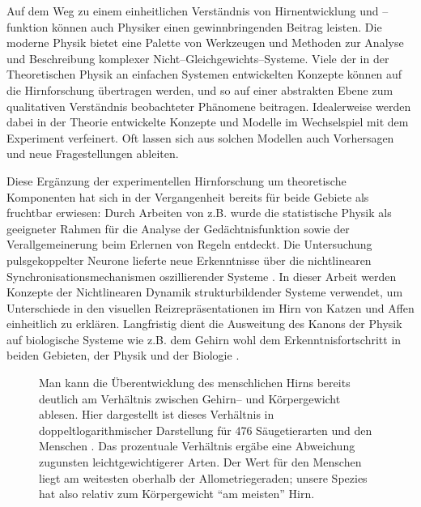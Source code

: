 Auf dem Weg zu einem einheitlichen Verständnis von Hirnentwicklung und
\mbox{--funktion} können auch Physiker einen gewinnbringenden Beitrag leisten.
Die moderne Physik bietet eine Palette von Werkzeugen und Methoden zur
Analyse und Beschreibung komplexer Nicht--Gleichgewichts--Systeme.  Viele
der in der Theoretischen Physik an einfachen Systemen entwickelten Konzepte
können auf die Hirnforschung übertragen werden, und so auf einer
abstrakten Ebene zum qualitativen Verständnis beobachteter Phänomene
beitragen. Idealerweise werden dabei in der Theorie entwickelte Konzepte
und Modelle im Wechselspiel mit dem Experiment verfeinert. Oft lassen sich
aus solchen Modellen auch Vorhersagen und neue Fragestellungen ableiten.

Diese Ergänzung der experimentellen Hirnforschung um theoretische
Komponenten hat sich in der Vergangenheit bereits für beide Gebiete als
fruchtbar erwiesen: Durch Arbeiten von 
z.B. wurde die statistische Physik als geeigneter Rahmen für die Analyse
der Gedächtnisfunktion sowie der Verallgemeinerung beim Erlernen von
Regeln entdeckt.  Die Untersuchung pulsgekoppelter Neurone lieferte neue
Erkenntnisse über die nichtlinearen Synchronisationsmechanismen
oszillierender Systeme .  In dieser
Arbeit werden Konzepte der Nichtlinearen Dynamik strukturbildender Systeme
verwendet, um Unterschiede in den visuellen Reizrepräsentationen im Hirn
von Katzen und Affen einheitlich zu erklären.  Langfristig dient die
Ausweitung des Kanons der Physik auf biologische Systeme wie z.B. dem
Gehirn wohl dem Erkenntnisfortschritt in beiden Gebieten, der Physik und
der Biologie \cite{braitenberg:1977}.

\begin{figure}[t]
\begin{center}
\end{center}
\caption{Man kann die Überentwicklung des menschlichen Hirns bereits
deutlich am Verhältnis zwischen Gehirn-- und Körpergewicht ablesen. Hier
dargestellt ist dieses Verhältnis in doppeltlogarithmischer Darstellung
für 476 Säugetierarten und den Menschen
\protect{}. Das prozentuale Verhältnis ergäbe
eine Abweichung zugunsten leichtgewichtigerer Arten.  Der Wert für den
Menschen liegt am weitesten oberhalb der Allometriegeraden; unsere Spezies
hat also relativ zum Körpergewicht ``am meisten'' Hirn.}
\label{hirnmasse}
\end{figure}

